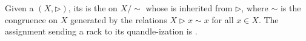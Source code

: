 \begin{definition} \label{definition:quandleization_of_a_rack}
    Given a  $(X, \rhd)$, its  is the  on $X/\sim$ whose  is inherited from $\rhd$, where $\sim$ is the congruence on $X$ generated by the relations $X \rhd x \sim x$ for all $x \in X$. The assignment sending a rack to its quandle-ization is . 
\end{definition}